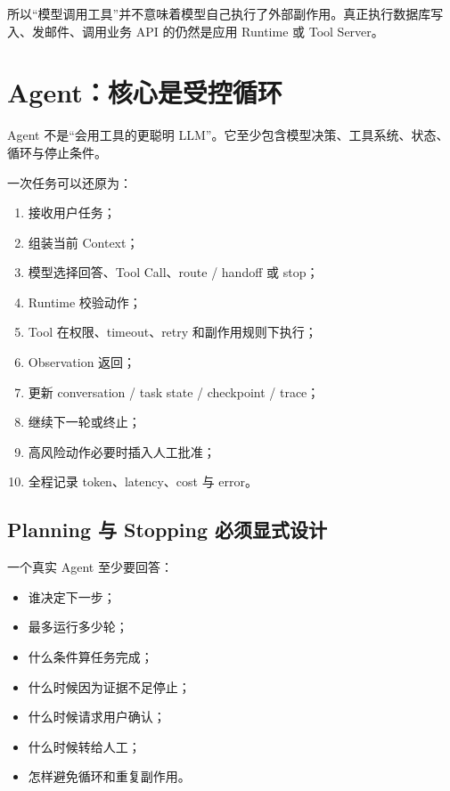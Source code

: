 \documentclass[profile=standard,twoside=false]{ipara-handbook}
\begin{document}
所以“模型调用工具”并不意味着模型自己执行了外部副作用。真正执行数据库写入、发邮件、调用业务 API 的仍然是应用 Runtime 或 Tool Server。

\section{Agent：核心是受控循环}

Agent 不是“会用工具的更聪明 LLM”。它至少包含模型决策、工具系统、状态、循环与停止条件。

一次任务可以还原为：

\begin{enumerate}
  \item 接收用户任务；
  \item 组装当前 Context；
  \item 模型选择回答、Tool Call、route / handoff 或 stop；
  \item Runtime 校验动作；
  \item Tool 在权限、timeout、retry 和副作用规则下执行；
  \item Observation 返回；
  \item 更新 conversation / task state / checkpoint / trace；
  \item 继续下一轮或终止；
  \item 高风险动作必要时插入人工批准；
  \item 全程记录 token、latency、cost 与 error。
\end{enumerate}

\begin{handbookdiagram}
\centering

\end{handbookdiagram}

\subsection{Planning 与 Stopping 必须显式设计}

一个真实 Agent 至少要回答：

\begin{itemize}
  \item 谁决定下一步；
  \item 最多运行多少轮；
  \item 什么条件算任务完成；
  \item 什么时候因为证据不足停止；
  \item 什么时候请求用户确认；
  \item 什么时候转给人工；
  \item 怎样避免循环和重复副作用。
\end{itemize}
\end{document}
